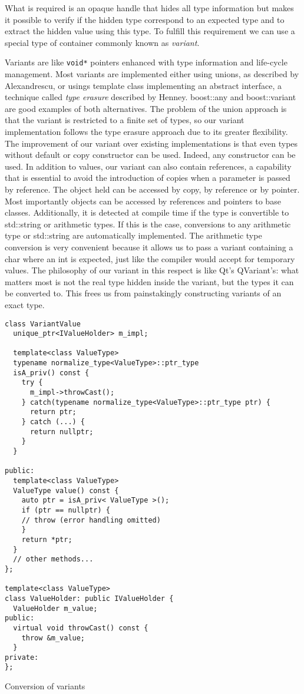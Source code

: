 What is required is an opaque handle that hides all type information but makes it possible to verify if the hidden type correspond to an
expected type and to extract the hidden value using this type. To fulfill this requirement we can use a special type of container
commonly known as \emph{variant}.

Variants are like \texttt{void*} pointers enhanced with type information and life-cycle management.
Most variants are implemented either using unions, as described by Alexandrescu\cite{Alexandrescu2}, or usings template class implementing
an abstract interface, a technique called \emph{type erasure} \cite{Becker} described by Henney\cite{Henney}. boost::any and boost::variant\cite{boost}
are good examples of both alternatives. The problem of the union approach is that the variant is restricted to a finite set of types, so our variant
implementation follows the type erasure approach due to its greater flexibility. The improvement of our variant over existing implementations
is that even types without default or copy constructor can be used. Indeed, any constructor can be used. In addition to values, our variant
can also contain references, a capability that is essential to avoid the introduction of copies when a parameter is passed by reference.
The object held can be accessed by copy, by reference or by pointer. Most importantly objects can be accessed by references and pointers to
base classes. Additionally, it is detected at compile time if the type is convertible to std::string or arithmetic types. If this is the
case, conversions to any arithmetic type or std::string are automatically implemented. The arithmetic type conversion is very convenient
because it allows us to pass a variant containing a char where an int is expected, just like the compiler would accept for temporary values.
The philosophy of our variant in this respect is like Qt's QVariant's\cite{qt}: what matters most is not the real type hidden inside the
variant, but the types it can be converted to. This frees us from painstakingly constructing variants of an exact type.

\begin{listing}[H]
\begin{verbatim}
class VariantValue
  unique_ptr<IValueHolder> m_impl;
  
  template<class ValueType>
  typename normalize_type<ValueType>::ptr_type 
  isA_priv() const {
    try {
      m_impl->throwCast();
    } catch(typename normalize_type<ValueType>::ptr_type ptr) {
      return ptr;
    } catch (...) {
      return nullptr;
    }
  }
  
public:
  template<class ValueType>
  ValueType value() const {
    auto ptr = isA_priv< ValueType >();
    if (ptr == nullptr) {
	// throw (error handling omitted)
    }
    return *ptr;
  }
  // other methods...
};

template<class ValueType>
class ValueHolder: public IValueHolder {
  ValueHolder m_value;
public:
  virtual void throwCast() const {
    throw &m_value;
  }
private:	
};
\end{verbatim}
\caption{Conversion of variants}
\label{lst:listing11}
\end{listing}

